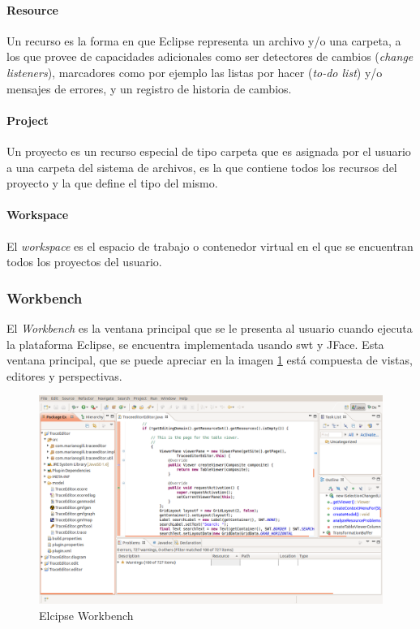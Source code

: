 \documentclass[a4paper,12pt,twoside,spanish,openright]{book}
\begin{document}
\paragraph{Resource} Un recurso es la forma en que \textsf{Eclipse} representa un archivo y/o una carpeta, a los que provee de capacidades adicionales como ser detectores de cambios (\textit{change listeners}), marcadores como por ejemplo las listas por hacer (\textit{to-do list}) y/o mensajes de errores, y un registro de historia de cambios.

\paragraph{Project} Un proyecto es un recurso especial de tipo carpeta que es asignada por el usuario a una carpeta del sistema de archivos, es la que contiene todos los recursos del proyecto y la que define el tipo del mismo.

\paragraph{Workspace} El \textit{workspace} es el espacio de trabajo o contenedor virtual en el que se encuentran todos los proyectos del usuario.


\subsubsection{Workbench}

El \textit{Workbench} es la ventana principal que se le presenta al usuario cuando ejecuta la plataforma \textsf{Eclipse}, se encuentra implementada usando \gls{swt} y JFace. Esta ventana principal, que se puede apreciar en la imagen \ref{fig:EclipseWorkbench} está compuesta de vistas, editores y perspectivas.

\begin{figure}[hbtp]
\centering
\includegraphics[scale=0.31]{./img/EclipseWorkbench}
\caption{Elcipse Workbench}
\label{fig:EclipseWorkbench}
\end{figure}
\end{document}

